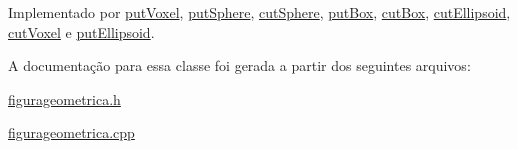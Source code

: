 Implementado por \mbox{\hyperlink{classput_voxel_ab0be1f883d42ede6169d3d08ee09b9ac}{put\+Voxel}}, \mbox{\hyperlink{classput_sphere_a8a6aa041c7b3c8336ac703484f78e543}{put\+Sphere}}, \mbox{\hyperlink{classcut_sphere_a647eb845a169437c5c336bdcb282b075}{cut\+Sphere}}, \mbox{\hyperlink{classput_box_ae472342f54d086fd05be3d1e321e1ec7}{put\+Box}}, \mbox{\hyperlink{classcut_box_a4806d6d924af863d7df8cd0d9f8b0959}{cut\+Box}}, \mbox{\hyperlink{classcut_ellipsoid_aa0059cc77c6bb3d4c6c5dd9081ba07c1}{cut\+Ellipsoid}}, \mbox{\hyperlink{classcut_voxel_a5597800b2270f51a9526ba9b3f751101}{cut\+Voxel}} e \mbox{\hyperlink{classput_ellipsoid_aa93e397eb4d04278a08225c9536ba16b}{put\+Ellipsoid}}.


\begin{DoxyCode}{0}

\end{DoxyCode}


A documentação para essa classe foi gerada a partir dos seguintes arquivos\+:\begin{DoxyCompactItemize}
\item 
\mbox{\hyperlink{figurageometrica_8h}{figurageometrica.\+h}}\item 
\mbox{\hyperlink{figurageometrica_8cpp}{figurageometrica.\+cpp}}\end{DoxyCompactItemize}

